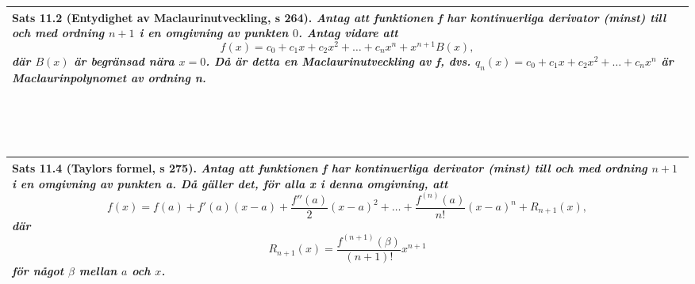 \documentclass[a4paper]{article}
\begin{document}
\begin{tabular}{|L{11.5cm}|} \hline
\textbf{Sats 11.2} (Entydighet av Maclaurinutveckling, s 264).
\textit{Antag att funktionen f har kontinuerliga derivator (minst) till och med ordning $n+1$ i en omgivning av punkten $0$. Antag vidare att}
\begin{displaymath}
f(x)=c_0+c_1x+c_2x^2+\ldots+c_nx^n+x^{n+1}B(x),
\end{displaymath}
\textit{där $B(x)$ är begränsad nära $x=0$. Då är detta en Maclaurinutveckling av f, dvs. $q_n(x)=c_0+c_1x+c_2x^2+\ldots+c_nx^n$ är Maclaurinpolynomet av ordning n.}
\\\hline
\end{tabular}
\\\\\\
\begin{tabular}{|L{11.5cm}|} \hline
\textbf{Sats 11.4} (Taylors formel, s 275).
\textit{Antag att funktionen f har kontinuerliga derivator (minst) till och med ordning $n+1$ i en omgivning av punkten a. Då gäller det, för alla x i denna omgivning, att}
\begin{displaymath}
f(x)=f(a)+f'(a)(x-a)+\frac{f''(a)}{2}(x-a)^2+\ldots+\frac{f^{(n)}(a)}{n!}(x-a)^n+R_{n+1}(x),
\end{displaymath}
\textit{där}
\begin{displaymath}
R_{n+1}(x) = \frac{f^{(n+1)}(\beta)}{(n+1)!}x^{n+1}
\end{displaymath}
\textit{för något $\beta$ mellan $a$ och $x$.}
\\\hline
\end{tabular}
\\\\\\
\end{document}
